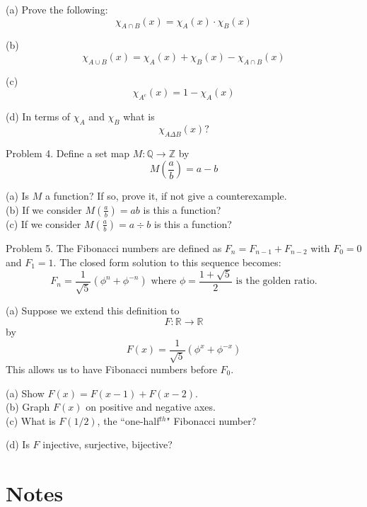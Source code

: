 \documentclass[16 pt]{amsart}
\theoremstyle{definition}
\theoremstyle{remark}
\numberwithin{equation}{subsection}
\newcommand{\R}{\mathbb{R}}
\newcommand{\Z}{\mathbb{Z}}
\newcommand{\Q}{\mathbb{Q}}
\begin{document}
(a) Prove the following:
\[
\chi_{A\cap B}(x) = \chi_A(x)\cdot\chi_B(x)
\]

(b)
\[
\chi_{A\cup B}(x) = \chi_A(x)+\chi_B(x)-\chi_{A\cap B}(x)
\]

(c)
\[
\chi_{A^c}(x) = 1 - \chi_A(x)
\]

(d) In terms of $\chi_A$ and $\chi_B$ what is
\[
\chi_{A\Delta B}(x)?
\]

\newpage 

Problem 4.  Define a set map $M:\Q\rightarrow \Z$ by
\[
M\left(\frac{a}{b}\right) = a-b
\]

(a) Is $M$ a function?  If so, prove it, if not give a counterexample.\\

(b) If we consider $M\left(\frac{a}{b}\right) = ab$ is this a function?\\

(c) If we consider $M\left(\frac{a}{b}\right) = a\div b$ is this a function?

\newpage

Problem 5.  The Fibonacci numbers are defined as $F_n = F_{n-1}+F_{n-2}$ with $F_0=0$ and $F_1=1$.  The closed form solution to this sequence becomes:
\[
F_n = \frac{1}{\sqrt{5}}(\phi^n + \phi^{-n}) \text{ where } \phi = \frac{1+\sqrt{5}}{2} \text{ is the golden ratio.}
\]

(a) Suppose we extend this definition to 
\[
F:\R \rightarrow \R 
\]
by
\[
F(x) = \frac{1}{\sqrt{5}}(\phi^x + \phi^{-x})
\]
This allows us to have Fibonacci numbers before $F_0$.

(a) Show $F(x) = F(x-1) + F(x-2)$.\\

(b) Graph $F(x)$ on positive and negative axes.\\

(c) What is $F(1/2)$, the ``one-half$^{th}$" Fibonacci number?

(d) Is $F$ injective, surjective, bijective?








\newpage

\section{Notes}
\end{document}
